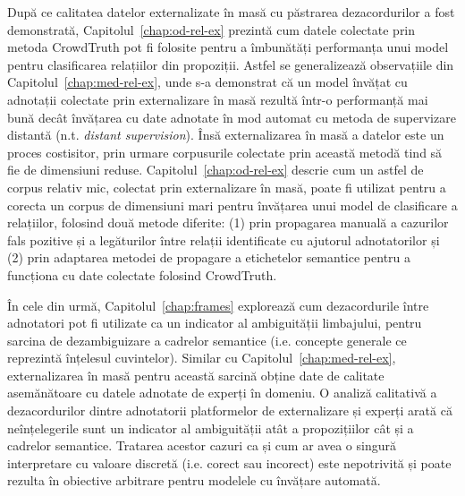 După ce calitatea datelor externalizate în masă cu păstrarea dezacordurilor a fost demonstrată, Capitolul~\ref{chap:od-rel-ex} prezintă cum datele colectate prin metoda CrowdTruth pot fi folosite pentru a îmbunătăți performanța unui model pentru clasificarea relațiilor din propoziții. Astfel se generalizează observațiile din Capitolul~\ref{chap:med-rel-ex}, unde s-a demonstrat că un model învățat cu adnotații colectate prin externalizare în masă rezultă într-o performanță mai bună decât învățarea cu date adnotate în mod automat cu metoda de supervizare distantă (n.t. \textit{distant supervision}). Însă externalizarea în masă a datelor este un proces costisitor, prin urmare corpusurile colectate prin această metodă tind să fie de dimensiuni reduse. Capitolul~\ref{chap:od-rel-ex} descrie cum un astfel de corpus relativ mic, colectat prin externalizare în masă, poate fi utilizat pentru a corecta un corpus de dimensiuni mari pentru învățarea unui model de clasificare a relațiilor, folosind două metode diferite: (1) prin propagarea manuală a cazurilor fals pozitive și a legăturilor între relații identificate cu ajutorul adnotatorilor și (2) prin adaptarea metodei de propagare a etichetelor semantice pentru a funcționa cu date colectate folosind CrowdTruth.

În cele din urmă, Capitolul~\ref{chap:frames} explorează cum dezacordurile între adnotatori pot fi utilizate ca un indicator al ambiguității limbajului, pentru sarcina de dezambiguizare a cadrelor semantice (i.e. concepte generale ce reprezintă înțelesul cuvintelor). Similar cu Capitolul~\ref{chap:med-rel-ex}, externalizarea în masă pentru această sarcină obține date de calitate asemănătoare cu datele adnotate de experți în domeniu. O analiză calitativă a dezacordurilor dintre adnotatorii platformelor de externalizare și experți arată că neînțelegerile sunt un indicator al ambiguității atât a propozițiilor cât și a cadrelor semantice. Tratarea acestor cazuri ca și cum ar avea o singură interpretare cu valoare discretă (i.e. corect sau incorect) este nepotrivită și poate rezulta în obiective arbitrare pentru modelele cu învățare automată. 





